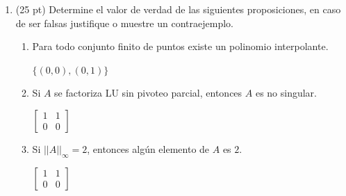 \documentclass[11pt]{article}
\begin{document}
\begin{enumerate}
\item  (25 pt) Determine el valor de verdad de las siguientes proposiciones, en caso de ser falsas justifique o muestre un contraejemplo.
\begin{enumerate}
	\item {} 
    \begin{minipage}{0.4\textwidth}
	Para todo conjunto finito de puntos existe un polinomio interpolante.
    \end{minipage} 
    \begin{minipage}{0.4\textwidth}
    $\{(0,0),(0,1)\}$
    \end{minipage}
    
    \vspace{7mm}
    \item {} 
    \begin{minipage}{0.4\textwidth}
	Si $A$ se factoriza LU sin pivoteo parcial, entonces $A$ es no singular.
    \end{minipage} 
    \begin{minipage}{0.4\textwidth}
    $\begin{bmatrix}
    1 & 1\\
    0 & 0
    \end{bmatrix}$
    \end{minipage}
     
     \vspace{7mm}
    \item {} 
    \begin{minipage}{0.4\textwidth}
	Si $||A||_{\infty}=2$, entonces alg\'un elemento de $A$ es $2$.
    \end{minipage} 
    \begin{minipage}{0.4\textwidth}
    $\begin{bmatrix}
    1 & 1\\
    0 & 0
    \end{bmatrix}$
    \end{minipage}
     

\end{enumerate}
\end{enumerate}
\end{document}
